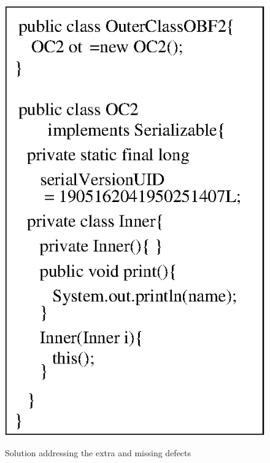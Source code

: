 \documentclass[conference]{IEEEtran}
\begin{document}
\begin{figure}[ht!]
{       \includegraphics[scale=0.65]{./prog6.eps}
	\label{fig:obfinnercls2}
}
\caption{Solution addressing the extra and missing defects}
\label{fig:missingdefects}
\end{figure}
%  
\end{document}
